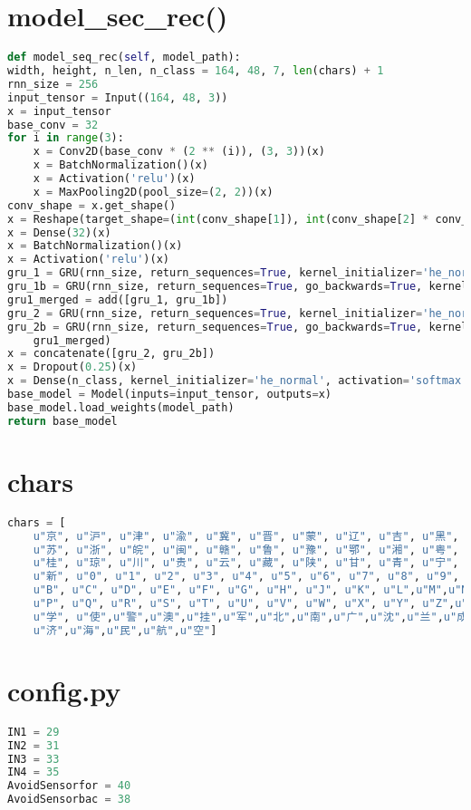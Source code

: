 \section{model\_sec\_rec()}\label{apdx:model_sec_rec}
\begin{lstlisting}[language=python]
def model_seq_rec(self, model_path):
width, height, n_len, n_class = 164, 48, 7, len(chars) + 1
rnn_size = 256
input_tensor = Input((164, 48, 3))
x = input_tensor
base_conv = 32
for i in range(3):
	x = Conv2D(base_conv * (2 ** (i)), (3, 3))(x)
	x = BatchNormalization()(x)
	x = Activation('relu')(x)
	x = MaxPooling2D(pool_size=(2, 2))(x)
conv_shape = x.get_shape()
x = Reshape(target_shape=(int(conv_shape[1]), int(conv_shape[2] * conv_shape[3])))(x)
x = Dense(32)(x)
x = BatchNormalization()(x)
x = Activation('relu')(x)
gru_1 = GRU(rnn_size, return_sequences=True, kernel_initializer='he_normal', name='gru1')(x)
gru_1b = GRU(rnn_size, return_sequences=True, go_backwards=True, kernel_initializer='he_normal', name='gru1_b')(x)
gru1_merged = add([gru_1, gru_1b])
gru_2 = GRU(rnn_size, return_sequences=True, kernel_initializer='he_normal', name='gru2')(gru1_merged)
gru_2b = GRU(rnn_size, return_sequences=True, go_backwards=True, kernel_initializer='he_normal', name='gru2_b')(
	gru1_merged)
x = concatenate([gru_2, gru_2b])
x = Dropout(0.25)(x)
x = Dense(n_class, kernel_initializer='he_normal', activation='softmax')(x)
base_model = Model(inputs=input_tensor, outputs=x)
base_model.load_weights(model_path)
return base_model
\end{lstlisting}

\section{chars}\label{apdx:chars}
\begin{lstlisting}[language=python]
chars = [
    u"京", u"沪", u"津", u"渝", u"冀", u"晋", u"蒙", u"辽", u"吉", u"黑",
    u"苏", u"浙", u"皖", u"闽", u"赣", u"鲁", u"豫", u"鄂", u"湘", u"粤",
    u"桂", u"琼", u"川", u"贵", u"云", u"藏", u"陕", u"甘", u"青", u"宁",
    u"新", u"0", u"1", u"2", u"3", u"4", u"5", u"6", u"7", u"8", u"9", u"A",
    u"B", u"C", u"D", u"E", u"F", u"G", u"H", u"J", u"K", u"L",u"M",u"N",
    u"P", u"Q", u"R", u"S", u"T", u"U", u"V", u"W", u"X", u"Y", u"Z",u"港",
    u"学", u"使",u"警",u"澳",u"挂",u"军",u"北",u"南",u"广",u"沈",u"兰",u"成", 
    u"济",u"海",u"民",u"航",u"空"]
\end{lstlisting}

\section{config.py}\label{apdx:config.py}
\begin{lstlisting}[language=python]
IN1 = 29
IN2 = 31
IN3 = 33
IN4 = 35
AvoidSensorfor = 40
AvoidSensorbac = 38
\end{lstlisting}

